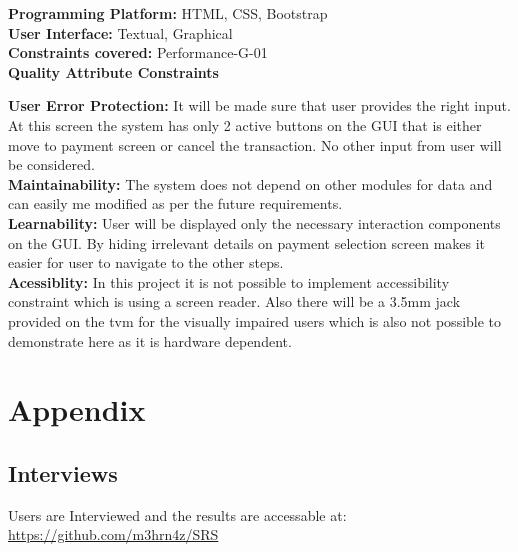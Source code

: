 \documentclass[a4paper,12pt]{report}
\begin{document}
\begin{flushleft}
	\vspace{0.5cm}
	\textbf{Programming Platform: } HTML, CSS, Bootstrap \\
	\textbf{User Interface:} Textual, Graphical \\
	\textbf{Constraints covered:} Performance-G-01 \\
	
	
	\vspace{0.5cm}
	\textbf{Quality Attribute Constraints}
	
	\vspace{0.5cm}
	\textbf{User Error Protection:} It will be made sure that user provides the right input. At this screen the system has only 2 active buttons on the GUI that is either move to payment screen or cancel the transaction. No other input from user will be considered. \\
	\textbf{Maintainability: } The system does not depend on other modules for data and can easily me modified as per the future requirements. \\
	\textbf{Learnability: } User will be displayed only the necessary interaction components on the GUI. By hiding irrelevant details on payment selection screen makes it easier for user to navigate to the other steps. \\
	\textbf{Acessiblity: } In this project it is not possible to implement accessibility constraint which is using a screen reader. Also there will be a 3.5mm jack provided on the tvm for the visually impaired users which is also not possible to demonstrate here as it is hardware dependent. \\
	
\end{flushleft}


%
%

\printbibliography[heading=subbibliography,title=References]

\printglossaries

\appendix
{}
\renewcommand{\thesection}{\Alph{section}}
\section{Appendix}
\subsection{Interviews}
Users are Interviewed and the results are accessable at: \href{https://github.com/m3hrn4z/SRS}{https://github.com/m3hrn4z/SRS}
\end{document}
